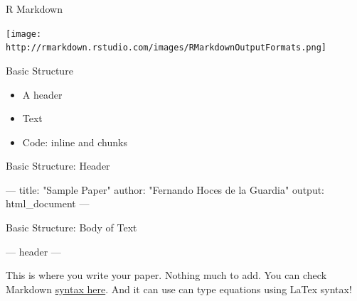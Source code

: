 \documentclass[ignorenonframetext,]{beamer}
\newenvironment{Shaded}{\begin{snugshade}}{\end{snugshade}}
\newcommand{\StringTok}[1]{\textcolor[rgb]{0.31,0.60,0.02}{{#1}}}
\newcommand{\NormalTok}[1]{{#1}}
\providecommand{\tightlist}{%
\setlength{\itemsep}{0pt}\setlength{\parskip}{0pt}}
\begin{document}
\begin{frame}{R Markdown}

\texttt{[image: http://rmarkdown.rstudio.com/images/RMarkdownOutputFormats.png]}

\end{frame}

\begin{frame}{Basic Structure}

\begin{itemize}
\tightlist
\item
  A header
\item
  Text
\item
  Code: inline and chunks
\end{itemize}

\end{frame}

\begin{frame}[fragile]{Basic Structure: Header}

\begin{Shaded}
\begin{Highlighting}[]
\NormalTok{---}
\NormalTok{title:}\StringTok{ "Sample Paper"}
\NormalTok{author:}\StringTok{ "Fernando Hoces de la Guardia"}
\NormalTok{output:}\StringTok{ }\NormalTok{html_document}
\NormalTok{---}
\end{Highlighting}
\end{Shaded}

\end{frame}

\begin{frame}[fragile]{Basic Structure: Body of Text}

\begin{Shaded}
\begin{Highlighting}[]
\NormalTok{---}
\NormalTok{header}
\NormalTok{---}
\end{Highlighting}
\end{Shaded}

This is where you write your paper. Nothing much to add. You can check
Markdown
\href{https://www.rstudio.com/wp-content/uploads/2015/02/rmarkdown-cheatsheet.pdf}{syntax
here}. And it can use can type equations using LaTex syntax!

\end{frame}
\end{document}
